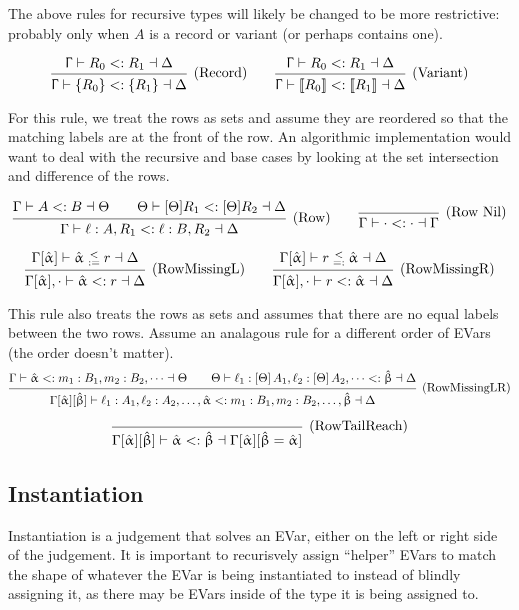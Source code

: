 \documentclass{article}
\newcommand{\vnt}[1]{\llbracket #1 \rrbracket}
\newcommand{\spc}{\qquad}
\newcommand{\ctx}{\Upgamma}
\newcommand{\lbl}{\ell}
\newcommand{\ev}{\hat}
\newcommand{\evar}[1][]{\ev \upalpha_{#1}}
\newcommand{\evaralt}{\ev \upbeta}
\newcommand{\ctxinout}[3]{#1 \vdash #2 \dashv #3}
\newcommand{\subsume}{<:}
\newcommand{\subsumes}[4]{\ctxinout {#1} {#2 \subsume #3} {#4}}
\newcommand{\instLSymbol}{\;\substack{<\\:=}\;}
\newcommand{\instRSymbol}{\;\substack{<\\=:}\;}
\newcommand{\apply}[1]{\left[#1\right]}
\newcommand{\instL}[4]{#1 \vdash #2 \instLSymbol #3 \dashv #4}
\newcommand{\instR}[4]{#1 \vdash #2 \instRSymbol #3 \dashv #4}
\newcommand{\deduct}[3][]
{
  \begin{prooftree}
    \hypo{#2}
    \infer1[\text{#1}]{#3}
  \end{prooftree}
}
\begin{document}
The above rules for recursive types will likely be changed to be more
restrictive: probably only when \(A\) is a record or variant (or perhaps
contains one).

\[
  \deduct[(Record)]{\subsumes{\ctx}{R_0}{R_1}{\Delta}}{\subsumes{\ctx}{\{R_0\}}{\{R_1\}}{\Delta}}
  \spc
  \deduct[(Variant)]{\subsumes{\ctx}{R_0}{R_1}{\Delta}}{\subsumes{\ctx}{\vnt {R_0}}{\vnt
    {R_1}}{\Delta}}
\]

For this rule, we treat the rows as sets and assume they are reordered so that
the matching labels are at the front of the row. An algorithmic implementation
would want to deal with the recursive and base cases by looking at the set
intersection and difference of the rows.

\[
  \deduct[(Row)]
  {\subsumes{\Gamma}{A}{B}{\Theta}
    \spc
    \subsumes{\Theta}{[\Theta] R_1}{[\Theta] R_2}{\Delta}
  }
  { \subsumes{\Gamma}{\lbl : A, R_1}{\lbl : B, R_2}{\Delta} }
  \spc
  \deduct[(Row Nil)]{}{ \subsumes{\Gamma}{\cdot}{\cdot}{\Gamma} }
\]

\[
  \deduct[(RowMissingL)]
  {\instL{\Gamma[\evar]}{\evar}{r}{\Delta}}
  {\subsumes{\Gamma[\evar], \cdot}{\evar}{r}{\Delta}}
  \spc
  \deduct[(RowMissingR)]
  {\instR{\Gamma[\evar]}{r}{\evar}{\Delta}}
  {\subsumes{\Gamma[\evar], \cdot}{r}{\evar}{\Delta}}
\]

This rule also treats the rows as sets and assumes that there are no equal
labels between the two rows. Assume an analagous rule for a different order of
EVars (the order doesn't matter).
\[
  \deduct[(RowMissingLR)]
  {\subsumes{\Gamma}{\evar}{m_1 : B_1, m_2 : B_2, \dots}{\Theta} \spc
    \subsumes{\Theta}{\lbl_1 : \apply\Theta A_1, \lbl_2 : \apply\Theta A_2,
      \dots}{\evaralt}{\Delta}}
  {\subsumes{\Gamma[\evar][\evaralt]}{\lbl_1 : A_1, \lbl_2 : A_2, \dots, \evar}{m_1 :
      B_1, m_2 : B_2, \dots, \evaralt}{\Delta}}
\]

\[
  \deduct[(RowTailReach)]
  {}
  {\subsumes{\Gamma[\evar][\evaralt]}{\evar}{\evaralt}{\Gamma[\evar][\evaralt=\evar]}}
\]


\subsection{Instantiation}

Instantiation is a judgement that solves an EVar, either on the left or right
side of the judgement. It is important to recurisvely assign ``helper'' EVars to
match the shape of whatever the EVar is being instantiated to instead of blindly
assigning it, as there may be EVars inside of the type it is being assigned to.
\end{document}

